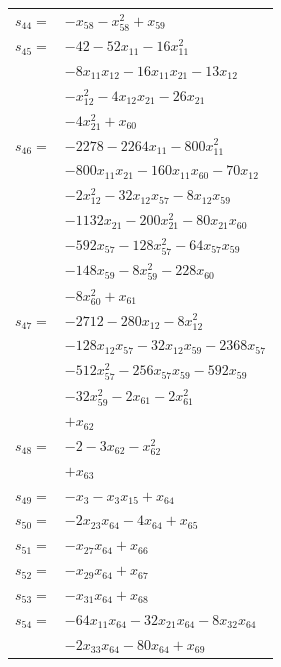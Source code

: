\begin{longtable}{@{}r@{\;}l@{}}
\(s_{44}=\) & \(\displaystyle -x_{58} -x_{58}^{2} +x_{59}\) \\[3pt]
\(s_{45}=\) & \(\displaystyle -42 -52x_{11} -16x_{11}^{2}\) \\
 & \(\displaystyle -8x_{11}x_{12} -16x_{11}x_{21} -13x_{12}\) \\
 & \(\displaystyle -x_{12}^{2} -4x_{12}x_{21} -26x_{21}\) \\
 & \(\displaystyle -4x_{21}^{2} +x_{60}\) \\[3pt]
\(s_{46}=\) & \(\displaystyle -2278 -2264x_{11} -800x_{11}^{2}\) \\
 & \(\displaystyle -800x_{11}x_{21} -160x_{11}x_{60} -70x_{12}\) \\
 & \(\displaystyle -2x_{12}^{2} -32x_{12}x_{57} -8x_{12}x_{59}\) \\
 & \(\displaystyle -1132x_{21} -200x_{21}^{2} -80x_{21}x_{60}\) \\
 & \(\displaystyle -592x_{57} -128x_{57}^{2} -64x_{57}x_{59}\) \\
 & \(\displaystyle -148x_{59} -8x_{59}^{2} -228x_{60}\) \\
 & \(\displaystyle -8x_{60}^{2} +x_{61}\) \\[3pt]
\(s_{47}=\) & \(\displaystyle -2712 -280x_{12} -8x_{12}^{2}\) \\
 & \(\displaystyle -128x_{12}x_{57} -32x_{12}x_{59} -2368x_{57}\) \\
 & \(\displaystyle -512x_{57}^{2} -256x_{57}x_{59} -592x_{59}\) \\
 & \(\displaystyle -32x_{59}^{2} -2x_{61} -2x_{61}^{2}\) \\
 & \(\displaystyle +x_{62}\) \\[3pt]
\(s_{48}=\) & \(\displaystyle -2 -3x_{62} -x_{62}^{2}\) \\
 & \(\displaystyle +x_{63}\) \\[3pt]
\(s_{49}=\) & \(\displaystyle -x_{3} -x_{3}x_{15} +x_{64}\) \\[3pt]
\(s_{50}=\) & \(\displaystyle -2x_{23}x_{64} -4x_{64} +x_{65}\) \\[3pt]
\(s_{51}=\) & \(\displaystyle -x_{27}x_{64} +x_{66}\) \\[3pt]
\(s_{52}=\) & \(\displaystyle -x_{29}x_{64} +x_{67}\) \\[3pt]
\(s_{53}=\) & \(\displaystyle -x_{31}x_{64} +x_{68}\) \\[3pt]
\(s_{54}=\) & \(\displaystyle -64x_{11}x_{64} -32x_{21}x_{64} -8x_{32}x_{64}\) \\
 & \(\displaystyle -2x_{33}x_{64} -80x_{64} +x_{69}\) \\[3pt]

\end{longtable}
